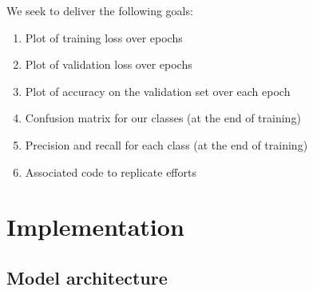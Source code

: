 \documentclass[letterpaper, 12pt]{article}
\begin{document}
We seek to deliver the following goals:
\begin{enumerate}
\item Plot of training loss over epochs
\item Plot of validation loss over epochs
\item Plot of accuracy on the validation set over each epoch
\item Confusion matrix for our classes (at the end of training)
\item Precision and recall for each class (at the end of training)
\item Associated code to replicate efforts
\end{enumerate}

\section{Implementation}
\subsection{Model architecture}
\end{document}
